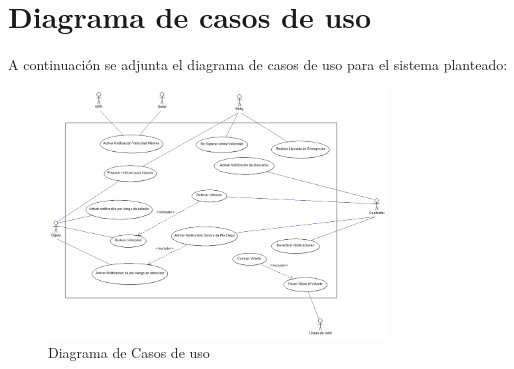 \section{Diagrama de casos de uso}
\par A continuación se adjunta el diagrama de casos de uso para el sistema planteado:

\begin{figure}[H]
\begin{center}
\includegraphics[width=0.8\textwidth]{./img/dcufinal.png}
\end{center}
\caption{Diagrama de Casos de uso}
\label{tab:dcufinal}
\end{figure}
